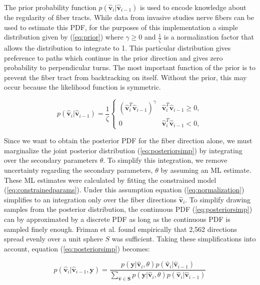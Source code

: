 The prior probability function $p(\mathbf{\hat{v}}_i | \mathbf{\hat{v}}_{i-1})$ is used to encode knowledge about the regularity of fiber tracts.  While data from invasive studies nerve fibers can be used to estimate this PDF, for the purposes of this implementation a simple distribution given by (\ref{eq:prior}) where $\gamma \ge 0$ and $\frac{1}{\zeta}$ is a normalization factor that allows the distribution to integrate to 1.  This particular distribution gives preference to paths which continue in the prior direction and gives zero probability to perpendicular turns.  The most important function of the prior is to prevent the fiber tract from backtracking on itself.  Without the prior, this may occur because the likelihood function is symmetric.

\begin{equation} \label{eq:prior}
p(\mathbf{\hat{v}}_i | \mathbf{\hat{v}}_{i-1}) = 
\frac{1}{\zeta} \left\{\begin{array}{ll}
	(\mathbf{\hat{v}}_i^T\mathbf{\hat{v}}_{i-1})^\gamma & \mathbf{\hat{v}}_i^T\mathbf{\hat{v}}_{i-1} \ge 0, \\
	0 & \mathbf{\hat{v}}_i^T\mathbf{\hat{v}}_{i-1} < 0,
 \end{array} \right.
\end{equation}

Since we want to obtain the posterior PDF for the fiber direction alone, we must marginalize the joint posterior distribution (\ref{eq:posteriorsimp}) by integrating over the secondary parameters $\theta$.  To simplify this integration, we remove uncertainty regarding the secondary parameters, $\theta$ by assuming an ML estimate.  These ML estimates were calculated by fitting the constrained model (\ref{eq:constrainedparams}).  Under this assumption equation (\ref{eq:normalization}) simplifies to an integration only over the fiber directions $\mathbf{\hat{v}}_i$.  To simplify drawing samples from the posterior distribution, the continuous PDF (\ref{eq:posteriorsimp}) can by approximated by a discrete PDF as long as the continuous PDF is sampled finely enough.  Friman et al. \cite{frimanTMI06} found empirically that 2,562 directions spread evenly over a unit sphere $S$ was sufficient.  Taking these simplifications into account, equation (\ref{eq:posteriorsimp}) becomes:

\begin{equation} \label{eq:posteriordiscrete}
p(\mathbf{\hat{v}}_i|\mathbf{\hat{v}}_{i-1}, \mathbf{y}) = 
\frac{p(\mathbf{y}| \mathbf{\hat{v}}_i, \theta) p(\mathbf{\hat{v}}_i | \mathbf{\hat{v}}_{i-1})}
{\sum_{\mathbf{\hat{v}} \in \mathbf{S}} p(\mathbf{y}| \mathbf{\hat{v}}_i, \theta) p(\mathbf{\hat{v}}_i | \mathbf{\hat{v}}_{i-1})}
\end{equation}

